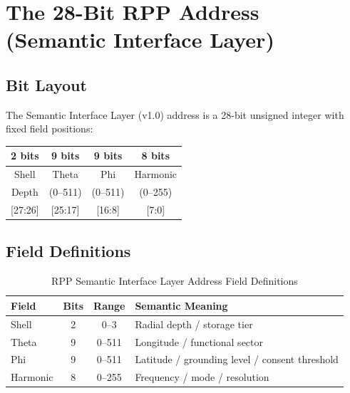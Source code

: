 \documentclass[11pt,a4paper]{article}
\begin{document}
\section{The 28-Bit RPP Address (Semantic Interface Layer)}

\subsection{Bit Layout}

The Semantic Interface Layer (v1.0) address is a 28-bit unsigned integer with fixed field positions:

\begin{center}
\begin{tabular}{|c|c|c|c|}
\hline
\textbf{2 bits} & \textbf{9 bits} & \textbf{9 bits} & \textbf{8 bits} \\
\hline
Shell & Theta & Phi & Harmonic \\
Depth & (0--511) & (0--511) & (0--255) \\
\hline
{[27:26]} & {[25:17]} & {[16:8]} & {[7:0]} \\
\hline
\end{tabular}
\end{center}

\subsection{Field Definitions}

\begin{table}[h]
\centering
\begin{tabular}{lccl}
\toprule
\textbf{Field} & \textbf{Bits} & \textbf{Range} & \textbf{Semantic Meaning} \\
\midrule
Shell & 2 & 0--3 & Radial depth / storage tier \\
Theta & 9 & 0--511 & Longitude / functional sector \\
Phi & 9 & 0--511 & Latitude / grounding level / consent threshold \\
Harmonic & 8 & 0--255 & Frequency / mode / resolution \\
\bottomrule
\end{tabular}
\caption{RPP Semantic Interface Layer Address Field Definitions}
\label{tab:fields}
\end{table}
\end{document}
